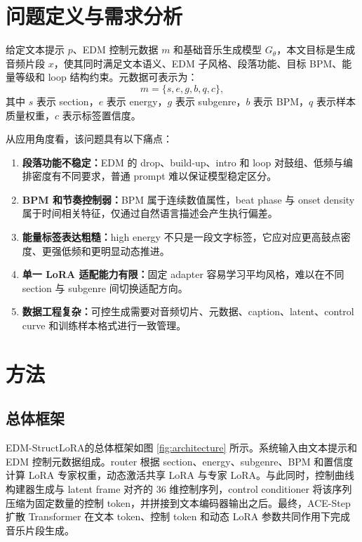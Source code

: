 \documentclass[UTF8,a4paper,zihao=-4,fontset=none]{ctexart}
\newcommand{\modelname}{EDM-StructLoRA}
\begin{document}
\section{问题定义与需求分析}

给定文本提示 $p$、EDM 控制元数据 $m$ 和基础音乐生成模型 $G_{\theta}$，本文目标是生成音频片段 $x$，使其同时满足文本语义、EDM 子风格、段落功能、目标 BPM、能量等级和 loop 结构约束。元数据可表示为：
\begin{equation}
  m = \{s, e, g, b, q, c\},
\end{equation}
其中 $s$ 表示 section，$e$ 表示 energy，$g$ 表示 subgenre，$b$ 表示 BPM，$q$ 表示样本质量权重，$c$ 表示标签置信度。

从应用角度看，该问题具有以下痛点：

\begin{enumerate}[leftmargin=2em,itemsep=0.2em]
  \item \textbf{段落功能不稳定：}EDM 的 drop、build-up、intro 和 loop 对鼓组、低频与编排密度有不同要求，普通 prompt 难以保证模型稳定区分。
  \item \textbf{BPM 和节奏控制弱：}BPM 属于连续数值属性，beat phase 与 onset density 属于时间相关特征，仅通过自然语言描述会产生执行偏差。
  \item \textbf{能量标签表达粗糙：}high energy 不只是一段文字标签，它应对应更高鼓点密度、更强低频和更明显动态推进。
  \item \textbf{单一 LoRA 适配能力有限：}固定 adapter 容易学习平均风格，难以在不同 section 与 subgenre 间切换适配方向。
  \item \textbf{数据工程复杂：}可控生成需要对音频切片、元数据、caption、latent、control curve 和训练样本格式进行一致管理。
\end{enumerate}

\section{方法}

\subsection{总体框架}

\modelname 的总体框架如图 \ref{fig:architecture} 所示。系统输入由文本提示和 EDM 控制元数据组成。router 根据 section、energy、subgenre、BPM 和置信度计算 LoRA 专家权重，动态激活共享 LoRA 与专家 LoRA。与此同时，控制曲线构建器生成与 latent frame 对齐的 36 维控制序列，control conditioner 将该序列压缩为固定数量的控制 token，并拼接到文本编码器输出之后。最终，ACE-Step 扩散 Transformer 在文本 token、控制 token 和动态 LoRA 参数共同作用下完成音乐片段生成。
\end{document}
